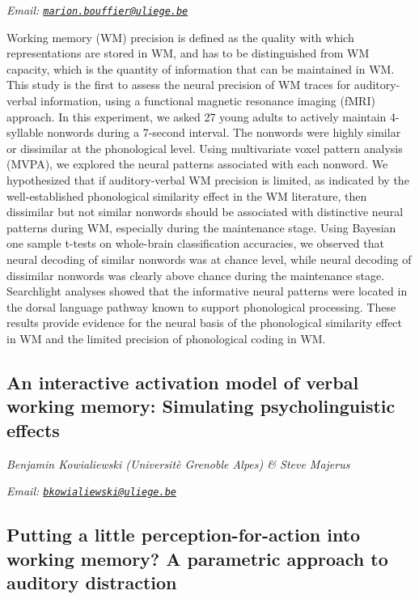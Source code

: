 \documentclass[12pt,]{book}
\begin{document}
\emph{Email: \href{mailto:marion.bouffier@uliege.be}{\nolinkurl{marion.bouffier@uliege.be}}}

Working memory (WM) precision is defined as the quality with which representations are stored in WM, and has to be distinguished from WM capacity, which is the quantity of information that can be maintained in WM. This study is the first to assess the neural precision of WM traces for auditory-verbal information, using a functional magnetic resonance imaging (fMRI) approach. In this experiment, we asked 27 young adults to actively maintain 4-syllable nonwords during a 7-second interval. The nonwords were highly similar or dissimilar at the phonological level. Using multivariate voxel pattern analysis (MVPA), we explored the neural patterns associated with each nonword. We hypothesized that if auditory-verbal WM precision is limited, as indicated by the well-established phonological similarity effect in the WM literature, then dissimilar but not similar nonwords should be associated with distinctive neural patterns during WM, especially during the maintenance stage. Using Bayesian one sample t-tests on whole-brain classification accuracies, we observed that neural decoding of similar nonwords was at chance level, while neural decoding of dissimilar nonwords was clearly above chance during the maintenance stage. Searchlight analyses showed that the informative neural patterns were located in the dorsal language pathway known to support phonological processing. These results provide evidence for the neural basis of the phonological similarity effect in WM and the limited precision of phonological coding in WM.

\hypertarget{an-interactive-activation-model-of-verbal-working-memory-simulating-psycholinguistic-effects}{%
\subsection{An interactive activation model of verbal working memory: Simulating psycholinguistic effects}\label{an-interactive-activation-model-of-verbal-working-memory-simulating-psycholinguistic-effects}}

\emph{Benjamin Kowialiewski (Universitè Grenoble Alpes) \& Steve Majerus}

\emph{Email: \href{mailto:bkowialiewski@uliege.be}{\nolinkurl{bkowialiewski@uliege.be}}}

\hypertarget{putting-a-little-perception-for-action-into-working-memory-a-parametric-approach-to-auditory-distraction}{%
\subsection{Putting a little perception-for-action into working memory? A parametric approach to auditory distraction}\label{putting-a-little-perception-for-action-into-working-memory-a-parametric-approach-to-auditory-distraction}}
\end{document}
